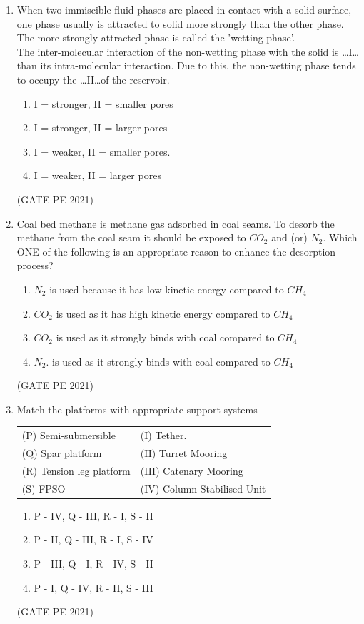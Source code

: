 \documentclass[journal,12pt,onecolumn]{IEEEtran}
\theoremstyle{remark}
\begin{document}
\begin{enumerate}
\item When two immiscible fluid phases are placed in contact with a solid surface, one phase usually is attracted to solid more strongly than the other phase. The more strongly attracted phase is called the 'wetting phase'.\\
The inter-molecular interaction of the non-wetting phase with the solid is \dots I\dots  than its intra-molecular interaction. Due to this, the non-wetting phase tends to occupy the \dots II\dots of the reservoir.
\begin{enumerate}
    \item I = stronger, II = smaller pores
    \item I = stronger, II = larger pores
    \item I = weaker, II = smaller pores.
    \item I = weaker, II = larger pores
\end{enumerate}
\hfill{(GATE PE 2021)}

\item Coal bed methane is methane gas adsorbed in coal seams. To desorb the methane from the coal seam it should be exposed to $CO_2$ and (or) $N_2$. Which ONE of the following is an appropriate reason to enhance the desorption process?\\
\begin{enumerate}
    \item $N_2$ is used because it has low kinetic energy compared to $CH_4$
    \item $CO_2$ is used as it has high kinetic energy compared to $CH_4$
    \item $CO_2$ is used as it strongly binds with coal compared to $CH_4$
    \item $N_2$. is used as it strongly binds with coal compared to $CH_4$
\end{enumerate}
\hfill{(GATE PE 2021)}

\item Match the platforms with appropriate support systems\\
\begin{tabular}{ll}
(P) Semi-submersible& (I) Tether.\\
(Q) Spar platform& (II) Turret Mooring\\
(R) Tension leg platform& (III) Catenary Mooring \\
(S) FPSO & (IV) Column Stabilised Unit \\
\end{tabular}
\begin{enumerate}
    \item P - IV, Q - III, R - I, S - II \\
    \item P - II, Q - III, R - I, S - IV\\
    \item P - III, Q - I, R - IV, S - II\\
    \item P - I, Q - IV, R - II, S - III
\end{enumerate}
\hfill{(GATE PE 2021)}


\end{enumerate}
\end{document}
